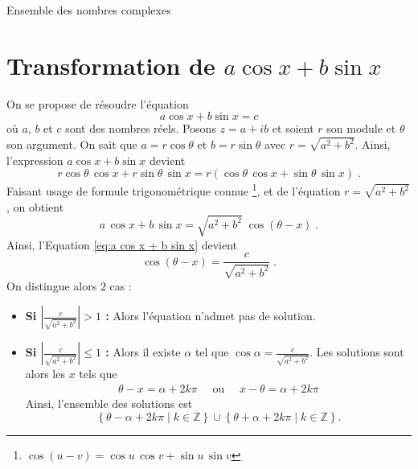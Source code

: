 \begin{chapter}{Ensemble des nombres complexes}
\section{Transformation de $a \cos x + b \sin x$}
%
%
On se propose de r\'esoudre l'\'equation 
\begin{equation}
a \cos x + b \sin x = c
\label{eq:a cos x + b sin x}
\end{equation}
o\`u $a$, $b$ et $c$ sont des nombres r\'eels.
Posons $z = a+ i b $ et soient $r$ son module et $\theta$ son argument.
On sait que $ a = r \cos \theta$ et $b = r \sin \theta$ avec $r = \sqrt{a^2 + b^2}$.
Ainsi, l'expression $a \cos x + b \sin x $ devient
$$
r \cos \theta \, \cos x + r \sin \theta \, \sin x = r \left( \cos \theta \, \cos x + \sin \theta \, \sin x \right) \; .
$$
Faisant usage de formule trigonom\'etrique connue \footnote{$\cos( u - v ) = \cos u \, \cos v + \sin u \, \sin v$}, et de l'\'equation $r = \sqrt{a^2 + b^2}$, on obtient
$$
a \, \cos x + b \, \sin x = \sqrt{a^2 + b^2} \; \cos (\theta - x) \; .
$$
Ainsi, l'Equation \ref{eq:a cos x + b sin x} devient 
\begin{equation}
\cos (\theta - x) = \frac{c}{\sqrt{a^2 + b^2}} \; .
\label{eq:cos (theta - x) = c/r}
\end{equation}
On distingue alors $2$ cas : 
\begin{itemize}
\item \textbf{ Si $ \left| \frac{c}{\sqrt{a^2 + b^2}} \right| > 1$ : } \newline
      Alors l'\'equation n'admet pas de solution.
\item \textbf{ Si $ \left| \frac{c}{\sqrt{a^2 + b^2}} \right| \leq 1$ : } \newline
      Alors il existe $\alpha$ tel que $\cos \alpha =  \frac{c}{\sqrt{a^2 + b^2}} $.
      Les solutions sont alors les $x$ tels que 
      \begin{align*}
      \theta - x = \alpha + 2 k \pi 
      \quad \text{ ou } \quad
      x - \theta = \alpha + 2 k \pi
      \end{align*}
      Ainsi, l'ensemble des solutions est
      \[
      \left\lbrace \theta - \alpha + 2 k \pi \mid k \in \mathbb{Z} \right\rbrace 
      \cup 
      \left\lbrace \theta + \alpha + 2 k \pi \mid k \in \mathbb{Z} \right\rbrace
      .
      \]
\end{itemize}
%
\begin{ex}

\end{ex}
\end{chapter}

